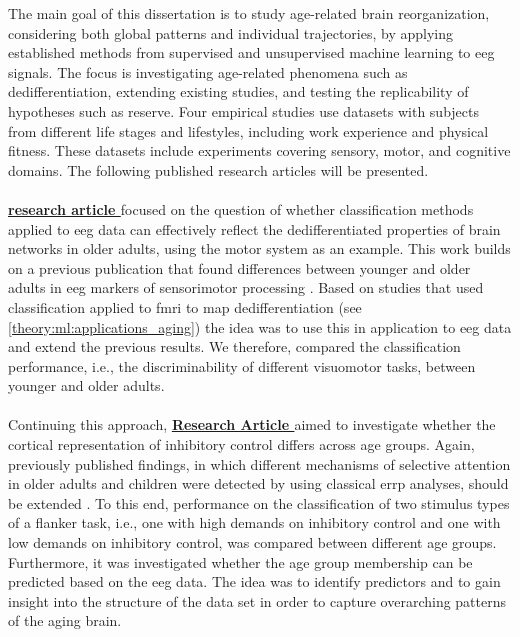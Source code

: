 The main goal of this dissertation is to study age-related brain reorganization, considering both global patterns and individual trajectories, by applying established methods from supervised and unsupervised machine learning to \gls{eeg} signals. The focus is investigating age-related phenomena such as dedifferentiation, extending existing studies, and testing the replicability of hypotheses such as reserve. Four empirical studies use datasets with subjects from different life stages and lifestyles, including work experience and physical fitness. These datasets include experiments covering sensory, motor, and cognitive domains. The following published research articles will be presented.\\
\\
\textbf{\hyperref[pub:paperI]{research article }} focused on the question of whether classification methods applied to \gls{eeg} data can effectively reflect the dedifferentiated properties of brain networks in older adults, using the motor system as an example. This work builds on a previous publication that found differences between younger and older adults in \gls{eeg} markers of sensorimotor processing \cite{vieluf2018age}. Based on studies that used classification applied to \gls{fmri} to map dedifferentiation (see \autoref{theory:ml:applications_aging}) the idea was to use this in application to \gls{eeg} data and extend the previous results. We therefore, compared the classification performance, i.e., the discriminability of different visuomotor tasks, between younger and older adults.\\
\\
Continuing this approach, \textbf{\hyperref[pub:paperII]{Research Article }} aimed to investigate whether the cortical representation of inhibitory control differs across age groups. Again, previously published findings, in which different mechanisms of selective attention in older adults and children were detected by using classical \gls{errp} analyses, should be extended \cite{Reuter2019}. To this end, performance on the classification of two stimulus types of a flanker task, i.e., one with high demands on inhibitory control and one with low demands on inhibitory control, was compared between different age groups. Furthermore, it was investigated whether the age group membership can be predicted based on the \gls{eeg} data. The idea was to identify predictors and to gain insight into the structure of the data set in order to capture overarching patterns of the aging brain. \\
